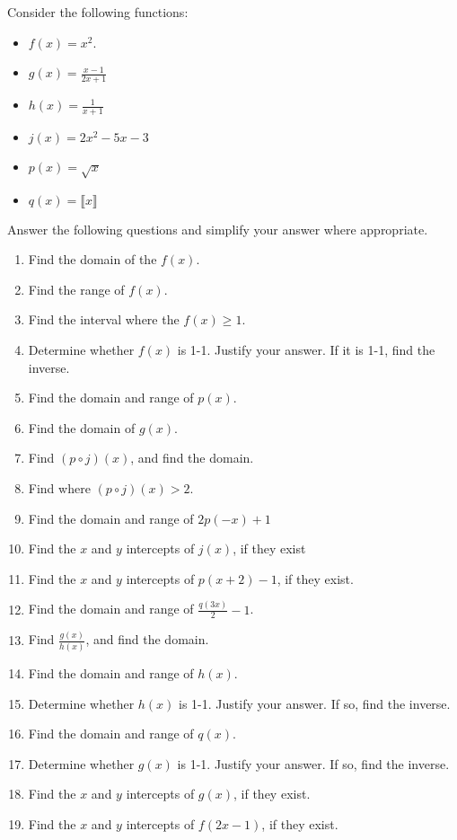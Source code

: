 \documentclass{ximera}
\begin{document}
\begin{exercise}
Consider the following functions:

\begin{itemize}
\item $f(x)=x^2$.
\item $\displaystyle g(x)=\frac{x-1}{2x+1}$
\item $\displaystyle h(x)=\frac{1}{x+1}$
\item $j(x) = 2x^2-5x-3$
\item $p(x)= \sqrt{x}$
\item $q(x)= \llbracket{x}\rrbracket$
\end{itemize}


Answer the following questions and simplify your answer where appropriate.
\begin{enumerate}
\item Find the domain of the $f(x)$. 
\item Find the range of $f(x)$. 
\item Find the interval where the $f(x)\geq1$.
\item Determine whether $f(x)$ is 1-1. Justify your answer. If it is 1-1, find the inverse. 
\item Find the domain and range of $p(x)$. 
\item Find the domain of $g(x)$. 
\item Find $(p\circ j)(x)$, and find the domain.   
\item Find where $(p\circ j)(x)>2$.
\item Find the domain and range of $2p(-x)+1$
\item Find the $x$ and $y$ intercepts of $j(x)$, if they exist 
\item Find the $x$ and $y$ intercepts of $p(x+2)-1$, if they exist.
\item Find the domain and range of $\displaystyle \frac{q(3x)}{2}-1$.
\item Find $\displaystyle \frac{g(x)}{h(x)}$, and find the domain. 
\item Find the domain and range of $h(x)$. 
\item Determine whether $h(x)$ is 1-1. Justify your answer. If so, find the inverse. 
\item Find the domain and range of $q(x)$. 
\item Determine whether $g(x)$ is 1-1. Justify your answer. If so, find the inverse. 
\item Find the $x$ and $y$ intercepts of $g(x)$, if they exist.
\item Find the $x$ and $y$ intercepts of $f(2x-1)$, if they exist. 

\end{enumerate}
\end{exercise}
\end{document}
